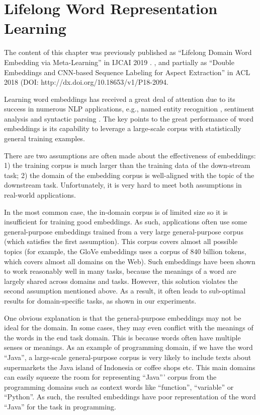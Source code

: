 
\chapter{Lifelong Word Representation Learning}
\label{chap3:word}

The content of this chapter was previously published as ``Lifelong Domain Word Embedding via Meta-Learning'' in IJCAI 2019 \cite{xumeta}. %
, and partially as ``Double Embeddings and CNN-based Sequence Labeling for Aspect Extraction'' in ACL 2018 \cite{xu_acl2018} (DOI: http://dx.doi.org/10.18653/v1/P18-2094. %

Learning word embeddings \cite{mnih2007three,mikolov2013efficient,mikolov2013distributed,pennington2014glove}
has received a great deal of attention due to its success in numerous NLP applications, e.g., named entity recognition \cite{sienvcnik2015adapting}, sentiment analysis \cite{maas2011learning} and syntactic parsing \cite{durrett2015neural}.
The key points to the great performance of word embeddings is its capability to leverage a large-scale corpus with statistically general training examples.

There are two assumptions are often made about the effectiveness of embeddings: 
1) the training corpus is much larger than the training data of the down-stream task; 2) the domain of the embedding corpus is well-aligned with the topic of the downstream task.
Unfortunately, it is very hard to meet both assumptions in real-world applications.

In the most common case, the in-domain corpus is of limited size so it is insufficient for training good embeddings. 
As such, applications often use some general-purpose embeddings trained from a very large general-purpose corpus (which satisfies the first assumption).
This corpus covers almost all possible topics (for example, the GloVe embeddings \cite{pennington2014glove} uses a corpus of 840 billion tokens, which covers almost all domains on the Web). 
Such embeddings have been shown to work reasonably well in many tasks, because the meanings of a word are largely shared across domains and tasks. 
However, this solution violates the second assumption mentioned above.
As a result, it often leads to sub-optimal results for domain-specific tasks, as shown in our experiments.

One obvious explanation is that the general-purpose embeddings may not be ideal for the domain.
In some cases, they may even conflict with the meanings of the words in the end task domain.
This is because words often have multiple senses or meanings.
As an example of programming domain, if we have the word ``Java'', a large-scale general-purpose corpus is very likely to include texts about supermarkets the Java island of Indonesia or coffee shops etc.
This main domains can easily squeeze the room for representing ``Java''' corpus from the programming domains such as context words like ``function'', ``variable'' or ``Python''.
As such, the resulted embeddings have poor representation of the word ``Java'' for the task in programming.  


